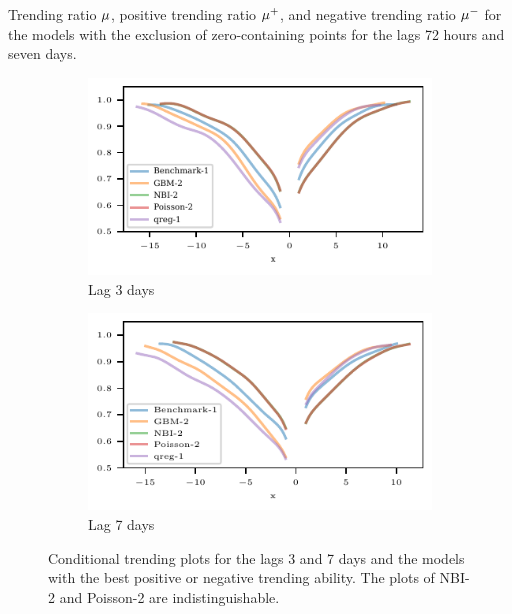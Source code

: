 \begin{table}
    \centering
    
    \caption{Trending ratio $\mu$, positive trending ratio $\mu^+$, and negative trending ratio $\mu^-$ for the models with the exclusion of zero-containing points for the lags 72 hours and seven days.}
    \label{tab:app-eda-trending-ratios}
\end{table}

\begin{figure}
    \centering
    \begin{subfigure}[t]{0.48\textwidth}
    \includegraphics{plots/ed_arrival/50_Cond_Prob_lag_3}
    \caption{Lag 3 days}
    \end{subfigure}\hfill
    \begin{subfigure}[t]{0.48\textwidth}
    \includegraphics{plots/ed_arrival/50_Cond_Prob_lag_7}
    \caption{Lag 7 days}
    \end{subfigure}
    \caption{Conditional trending plots for the lags 3 and 7 days and the models with the best positive or negative trending ability. The plots of NBI-2 and Poisson-2 are indistinguishable.}
    \label{fig:app-eda-cond-prob}
\end{figure}

